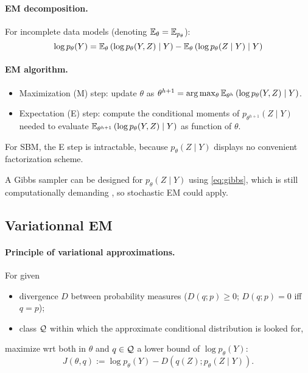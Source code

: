 \jump \paragraph{EM decomposition.}  \citep{DLR77} 
For incomplete data models (denoting $\mathbb E_\theta = \mathbb E_{p_\theta}$):
\begin{equation} \label{eq:EM}
\log p_\theta(Y) = \mathbb E_\theta \left( \log p_\theta(Y, Z) \mid Y \right) - \mathbb E_\theta \left( \log p_\theta(Z \mid Y) \mid Y \right)
\end{equation}

\jump \paragraph{EM algorithm.} 
\begin{itemize}
\item Maximization (M) step: update $\theta$ as
$\theta^{h+1} = \arg\max_\theta \mathbb E_{\theta^h} \left( \log p_\theta(Y, Z) \mid Y \right)$.
\item Expectation (E) step: compute the conditional moments of $p_{\theta^{h+1}}(Z \mid Y)$ needed to evaluate $\mathbb E_{\theta^{h+1}} \left( \log p_\theta(Y, Z) \mid Y \right)$ as function of $\theta$.
\end{itemize}

\ra For SBM, the E step is intractable, because $p_\theta(Z \mid Y)$ displays no convenient factorization scheme.

\ra A Gibbs sampler can be designed for $p_\theta(Z \mid Y)$ using \eqref{eq:gibbs}, which is still computationally demanding \citep{NoS01}, so stochastic EM could apply.

\blank
\subsection{Variationnal EM}

\jump \paragraph{Principle of variational approximations.}  \citep{Jaa01,WaJ08,BKM17} For given 
\begin{itemize}
\item divergence $D$ between probability measures ($D(q; p) \geq 0$; $D(q; p) = 0$ iff $q = p$);
\item class $\mathcal{Q}$ within which the approximate conditional distribution is looked for,
\end{itemize}
maximize wrt both in $\theta$ and $q \in \mathcal{Q}$ a lower bound of $\log p_\theta(Y)$:
\begin{equation} \label{eq:lowerbound}
J(\theta, q) := \log p_\theta(Y) - D\left(q(Z); p_\theta(Z \mid Y)\right).
\end{equation}


